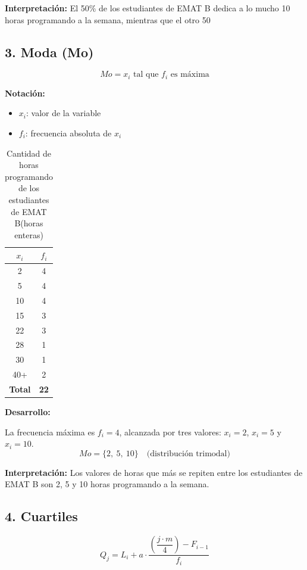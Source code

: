 \documentclass[12pt,letterpaper]{article}
\begin{document}
\textbf{Interpretación:} El 50\% de los estudiantes de EMAT B dedica a lo mucho 10 horas programando a la semana, mientras que el otro 50%

\subsection*{3. Moda (Mo)}
\begin{equation*}
    Mo = x_i \text{ tal que } f_i \text{ es máxima}
\end{equation*}

\textbf{Notación:}
\begin{itemize}
    \item $x_i$: valor de la variable
    \item $f_i$: frecuencia absoluta de $x_i$
\end{itemize}

\begin{table}[H]
    \centering
    \caption{Cantidad de horas programando de los estudiantes de EMAT B(horas enteras)}
    \label{tab:moda-horas}
    \begin{tabular}{@{}cc@{}}
        \toprule
        $x_i$ & $f_i$ \\
        \midrule
        2 & 4 \\
        5 & 4 \\
        10 & 4 \\
        15 & 3 \\
        22 & 3 \\
        28 & 1 \\
        30 & 1 \\
        40+ & 2 \\
        \midrule
        \textbf{Total} & \textbf{22} \\
        \bottomrule
    \end{tabular}
\end{table}

\textbf{Desarrollo:}

La frecuencia máxima es $f_i = 4$, alcanzada por tres valores: $x_i = 2$, $x_i = 5$ y $x_i = 10$.
\begin{equation*}
    Mo = \{2,\ 5,\ 10\} \quad \text{(distribución trimodal)}
\end{equation*}

\textbf{Interpretación:} Los valores de horas que más se repiten entre los estudiantes de EMAT B son 2, 5 y 10 horas programando a la semana.

\subsection*{4. Cuartiles}
\begin{equation*}
    Q_j = L_i + a \cdot \frac{\left(\dfrac{j \cdot m}{4}\right) - F_{i-1}}{f_i}
\end{equation*}
\end{document}

